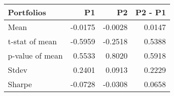 \begin{tabular}{lrrr}
\toprule
Portfolios & P1 & P2 & P2 - P1 \\
\midrule
Mean & -0.0175 & -0.0028 & 0.0147 \\
t-stat of mean & -0.5959 & -0.2518 & 0.5388 \\
p-value of mean & 0.5533 & 0.8020 & 0.5918 \\
Stdev & 0.2401 & 0.0913 & 0.2229 \\
Sharpe & -0.0728 & -0.0308 & 0.0658 \\
\bottomrule
\end{tabular}
